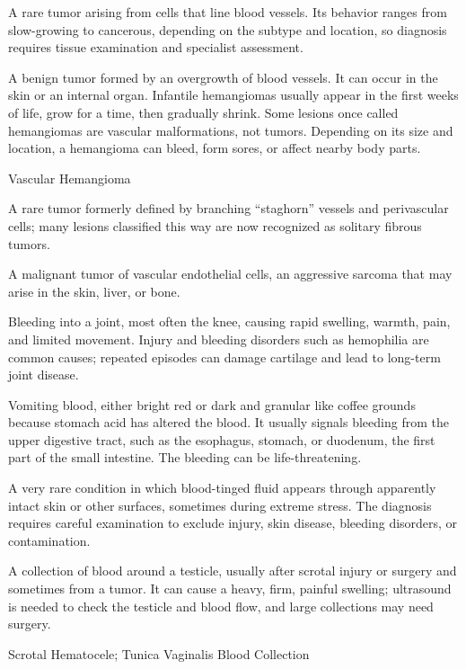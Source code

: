  A rare tumor arising from cells that line blood vessels. Its behavior ranges from slow-growing to cancerous, depending on the subtype and location, so diagnosis requires tissue examination and specialist assessment.

 A benign tumor formed by an overgrowth of blood vessels. It can occur in the skin or an internal organ. Infantile hemangiomas usually appear in the first weeks of life, grow for a time, then gradually shrink. Some lesions once called hemangiomas are vascular malformations, not tumors. Depending on its size and location, a hemangioma can bleed, form sores, or affect nearby body parts.

\synonyms
Vascular Hemangioma

 A rare tumor formerly defined by branching “staghorn” vessels and perivascular cells; many lesions classified this way are now recognized as solitary fibrous tumors.

 A malignant tumor of vascular endothelial cells, an aggressive sarcoma that may arise in
the skin, liver, or bone.

 Bleeding into a joint, most often the knee, causing rapid swelling, warmth, pain, and limited movement. Injury and bleeding disorders such as hemophilia are common causes; repeated episodes can damage cartilage and lead to long-term joint disease.

 Vomiting blood, either bright red or dark and granular like coffee grounds
because stomach acid has altered the blood. It usually signals bleeding from the upper digestive
tract, such as the esophagus, stomach, or duodenum, the first part of the small intestine. The
bleeding can be life-threatening.

 A very rare condition in which blood-tinged fluid appears through apparently intact skin or other surfaces, sometimes during extreme stress. The diagnosis requires careful examination to exclude injury, skin disease, bleeding disorders, or contamination.

 A collection of blood around a testicle, usually after scrotal injury or surgery and sometimes from a tumor. It can cause a heavy, firm, painful swelling; ultrasound is needed to check the testicle and blood flow, and large collections may need surgery.

\synonyms
Scrotal Hematocele; Tunica Vaginalis Blood Collection

